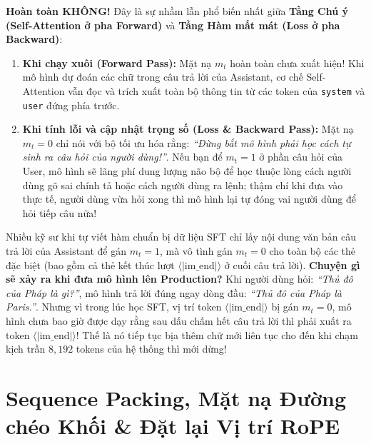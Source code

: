 \begin{debate}[Phản biện Kỹ thuật: ``Nếu gán $m_t = 0$ cho phần câu hỏi của User, chẳng phải mô hình sẽ phớt lờ và không thèm đọc câu hỏi của User hay sao?'']
\textbf{Hoàn toàn KHÔNG!} Đây là sự nhầm lẫn phổ biến nhất giữa \textbf{Tầng Chú ý (Self-Attention ở pha Forward)} và \textbf{Tầng Hàm mất mát (Loss ở pha Backward)}:
\begin{enumerate}[leftmargin=1.2cm]
    \item \textbf{Khi chạy xuôi (Forward Pass):} Mặt nạ $m_t$ hoàn toàn chưa xuất hiện! Khi mô hình dự đoán các chữ trong câu trả lời của Assistant, cơ chế Self-Attention vẫn đọc và trích xuất toàn bộ thông tin từ các token của \texttt{system} và \texttt{user} đứng phía trước.
    \item \textbf{Khi tính lỗi và cập nhật trọng số (Loss \& Backward Pass):} Mặt nạ $m_t = 0$ chỉ nói với bộ tối ưu hóa rằng: \textit{``Đừng bắt mô hình phải học cách tự sinh ra câu hỏi của người dùng!''}.
    Nếu bạn để $m_t = 1$ ở phần câu hỏi của User, mô hình sẽ lãng phí dung lượng não bộ để học thuộc lòng cách người dùng gõ sai chính tả hoặc cách người dùng ra lệnh; thậm chí khi đưa vào thực tế, người dùng vừa hỏi xong thì mô hình lại tự đóng vai người dùng để hỏi tiếp câu nữa!
\end{enumerate}
\end{debate}

\begin{caseexample}[Hậu quả thảm khốc khi quên gán $m_t = 1$ ở đúng 1 token $\langle|\text{im\_end}|\rangle$]
Nhiều kỹ sư khi tự viết hàm chuẩn bị dữ liệu SFT chỉ lấy nội dung văn bản câu trả lời của Assistant để gán $m_t = 1$, mà vô tình gán $m_t = 0$ cho toàn bộ các thẻ đặc biệt (bao gồm cả thẻ kết thúc lượt $\langle|\text{im\_end}|\rangle$ ở cuối câu trả lời).
\textbf{Chuyện gì sẽ xảy ra khi đưa mô hình lên Production?}
Khi người dùng hỏi: \textit{``Thủ đô của Pháp là gì?''}, mô hình trả lời đúng ngay dòng đầu: \textit{``Thủ đô của Pháp là Paris.''}. Nhưng vì trong lúc học SFT, vị trí token $\langle|\text{im\_end}|\rangle$ bị gán $m_t = 0$, mô hình chưa bao giờ được dạy rằng sau dấu chấm hết câu trả lời thì phải xuất ra token $\langle|\text{im\_end}|\rangle$! Thế là nó tiếp tục bịa thêm chữ mới liên tục cho đến khi chạm kịch trần $8,192$ tokens của hệ thống thì mới dừng!
\end{caseexample}

\section{Sequence Packing, Mặt nạ Đường chéo Khối \& Đặt lại Vị trí RoPE}
\label{sec:packing_eng}

